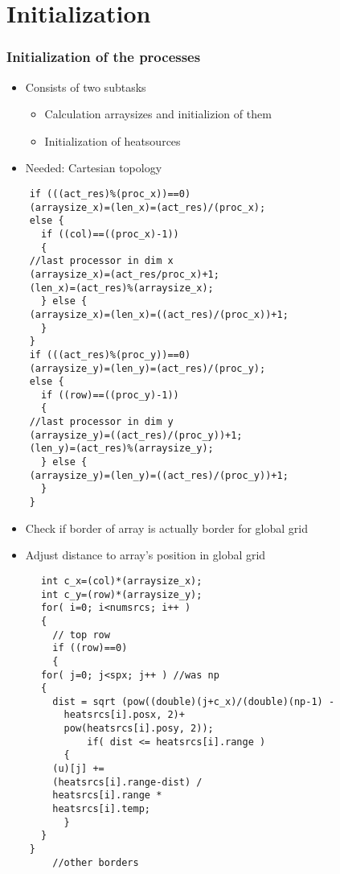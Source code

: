 \section{Initialization}
\begin{frame}
  \frametitle{Initialization of the processes}
  \begin{itemize}
  \item Consists of two subtasks
    \begin{itemize}
    \item Calculation arraysizes and initializion of them
    \item Initialization of heatsources
    \end{itemize}
    \item Needed: Cartesian topology
  \end{itemize}
\end{frame}


\begin{frame}[fragile]
  \begin{lstlisting}
    if (((act_res)%(proc_x))==0)
    (arraysize_x)=(len_x)=(act_res)/(proc_x);
    else {
      if ((col)==((proc_x)-1))
      {
	//last processor in dim x
	(arraysize_x)=(act_res/proc_x)+1;
	(len_x)=(act_res)%(arraysize_x);
      } else {
	(arraysize_x)=(len_x)=((act_res)/(proc_x))+1; 
      }
    }    
    if (((act_res)%(proc_y))==0)
    (arraysize_y)=(len_y)=(act_res)/(proc_y);
    else {
      if ((row)==((proc_y)-1))
      {
	//last processor in dim y
	(arraysize_y)=((act_res)/(proc_y))+1;
	(len_y)=(act_res)%(arraysize_y);
      } else {
	(arraysize_y)=(len_y)=((act_res)/(proc_y))+1; 
      }
    }
  \end{lstlisting}


\end{frame}



\begin{frame}
  \begin{itemize}
  \item Check if border of array is actually border for global grid
    \item Adjust distance to array's position in global grid
  \end{itemize}
\end{frame}




\begin{frame}[fragile]
  \begin{lstlisting}
      int c_x=(col)*(arraysize_x);
      int c_y=(row)*(arraysize_y);
      for( i=0; i<numsrcs; i++ )
      {
        // top row 
        if ((row)==0)
        {
	  for( j=0; j<spx; j++ ) //was np
	  { 
	    dist = sqrt (pow((double)(j+c_x)/(double)(np-1) -
	      heatsrcs[i].posx, 2)+
	      pow(heatsrcs[i].posy, 2));
              if( dist <= heatsrcs[i].range )
	      {
		(u)[j] += 
		(heatsrcs[i].range-dist) /
		heatsrcs[i].range *
		heatsrcs[i].temp;
	      }
	  }
	}
        //other borders
  \end{lstlisting}
\end{frame}

